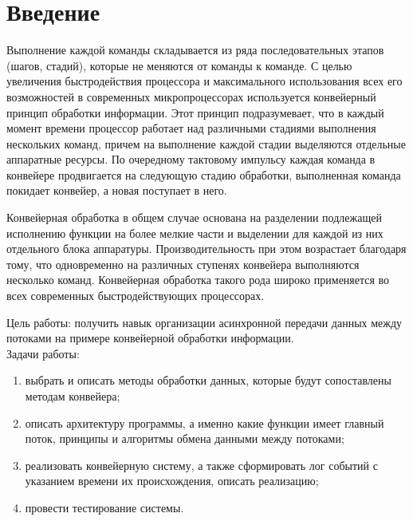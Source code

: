 \documentclass[a4paper,12pt]{report}
\begin{document}
	\setcounter{page}{2}
	\tableofcontents
    \chapter*{Введение}

        	Выполнение каждой команды складывается из ряда последовательных этапов (шагов, стадий), которые не меняются от команды к команде. 
        	С целью увеличения быстродействия процессора и максимального использования всех его возможностей в современных микропроцессорах используется конвейерный принцип обработки информации. Этот принцип подразумевает, что в каждый момент времени процессор работает над различными стадиями выполнения нескольких команд, причем на выполнение каждой стадии выделяются отдельные аппаратные ресурсы. По очередному тактовому импульсу каждая команда в конвейере продвигается на следующую стадию обработки, выполненная команда покидает конвейер, а новая поступает в него.
        	
        	Конвейерная обработка в общем случае основана на разделении подлежащей исполнению функции на более мелкие части и выделении для каждой из них отдельного блока аппаратуры. Производительность при этом возрастает благодаря тому, что одновременно на различных ступенях конвейера выполняются несколько команд. Конвейерная обработка такого рода широко применяется во всех современных быстродействующих процессорах.
        	
        	\vspace{0.5cm}
			Цель работы: получить навык организации асинхронной передачи данных между потоками на примере конвейерной обработки информации.\\
			
			Задачи работы:\\
			\begin{enumerate} 
				\item выбрать и описать методы обработки данных, которые будут сопоставлены методам конвейера;\\
				\item описать архитектуру программы, а именно какие функции имеет главный поток, принципы и алгоритмы обмена данными между потоками;\\
				\item реализовать конвейерную систему, а также сформировать лог событий с указанием времени их происхождения, описать реализацию;\\
				\item провести тестирование системы.\\
			\end{enumerate}
        \label{sec:intro}
\end{document}
